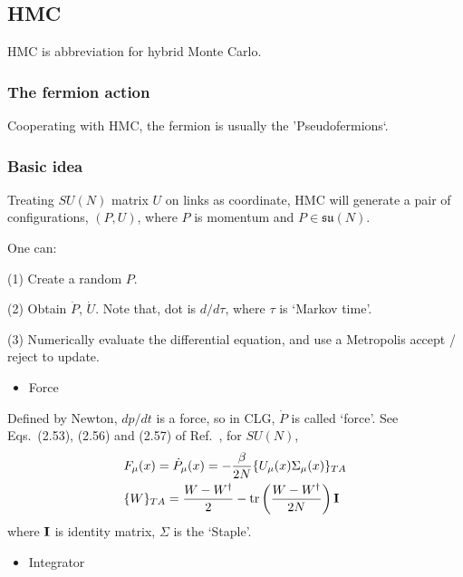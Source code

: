 \subsection{\label{hmc}HMC}

HMC is abbreviation for hybrid Monte Carlo.

\subsubsection{\label{hmc_scheme}The fermion action}

Cooperating with HMC, the fermion is usually the 'Pseudofermions`.

\subsubsection{\label{hmc_scheme}Basic idea}

Treating $SU(N)$ matrix $U$ on links as coordinate, HMC will generate a pair of configurations, $(P,U)$, where $P$ is momentum and $P\in \mathfrak{su}(N)$.

One can:

(1) Create a random $P$.

(2) Obtain $\dot{P}$, $\dot{U}$. Note that, dot is $d/d\tau$, where $\tau$ is `Markov time'.

(3) Numerically evaluate the differential equation, and use a Metropolis accept / reject to update.

\begin{itemize}
\item {}Force
\end{itemize}

Defined by Newton, $dp/dt$ is a force, so in CLG, $\dot{P}$ is called `force'. See Eqs.~(2.53), (2.56) and (2.57) of Ref.~\cite{latticeqcdbook2017}, for $SU(N)$,
\begin{equation}
\begin{split}
&F_{\mu}(x)=\dot{P}_{\mu}(x)=-\frac{\beta}{2N}\{U_{\mu}(x)\Sigma _{\mu}(x)\}_{TA}\\
&\{W\}_{TA}=\frac{W-W^{\dagger}}{2}-{\rm tr}\left(\frac{W-W^{\dagger}}{2N}\right){\bf I}\\
\end{split}
\label{eq.hmc.force}
\end{equation}
where ${\bf I}$ is identity matrix, $\Sigma$ is the `Staple'.

\begin{itemize}
\item {}Integrator
\end{itemize}

